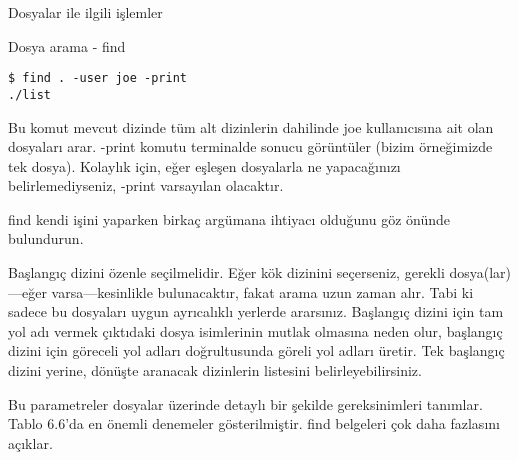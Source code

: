 \begin{section}{Dosyalar ile ilgili işlemler}
\begin{subsection}{Dosya arama - find}
\begin{verbatim}
$ find . -user joe -print
./list
\end{verbatim}
Bu komut mevcut dizinde tüm alt dizinlerin dahilinde joe kullanıcısına ait olan dosyaları arar. -print komutu terminalde sonucu görüntüler (bizim örneğimizde tek dosya). Kolaylık için, eğer eşleşen dosyalarla ne yapacağınızı belirlemediyseniz, -print varsayılan olacaktır.

find kendi işini yaparken birkaç argümana ihtiyacı olduğunu göz önünde bulundurun.

Başlangıç dizini özenle seçilmelidir. Eğer kök dizinini seçerseniz, gerekli dosya(lar)—eğer varsa—kesinlikle bulunacaktır, fakat arama uzun zaman alır. Tabi ki sadece bu dosyaları uygun ayrıcalıklı yerlerde ararsınız. Başlangıç dizini için tam yol adı vermek çıktıdaki dosya isimlerinin mutlak olmasına neden olur, başlangıç dizini için göreceli yol adları doğrultusunda göreli yol adları üretir. Tek başlangıç dizini yerine, dönüşte aranacak dizinlerin listesini belirleyebilirsiniz.

Bu parametreler dosyalar üzerinde detaylı bir şekilde gereksinimleri tanımlar. Tablo 6.6'da en önemli denemeler gösterilmiştir. find belgeleri çok daha fazlasını açıklar.


\end{subsection}
\end{section}
